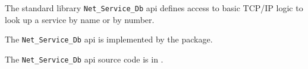 
The standard library {\tt Net\_Service\_Db} api defines access to basic {\sc TCP/IP} logic to 
look up a service by name or by number.

The {\tt Net\_Service\_Db} api is implemented by the  package.

The {\tt Net\_Service\_Db} api source code is in .
